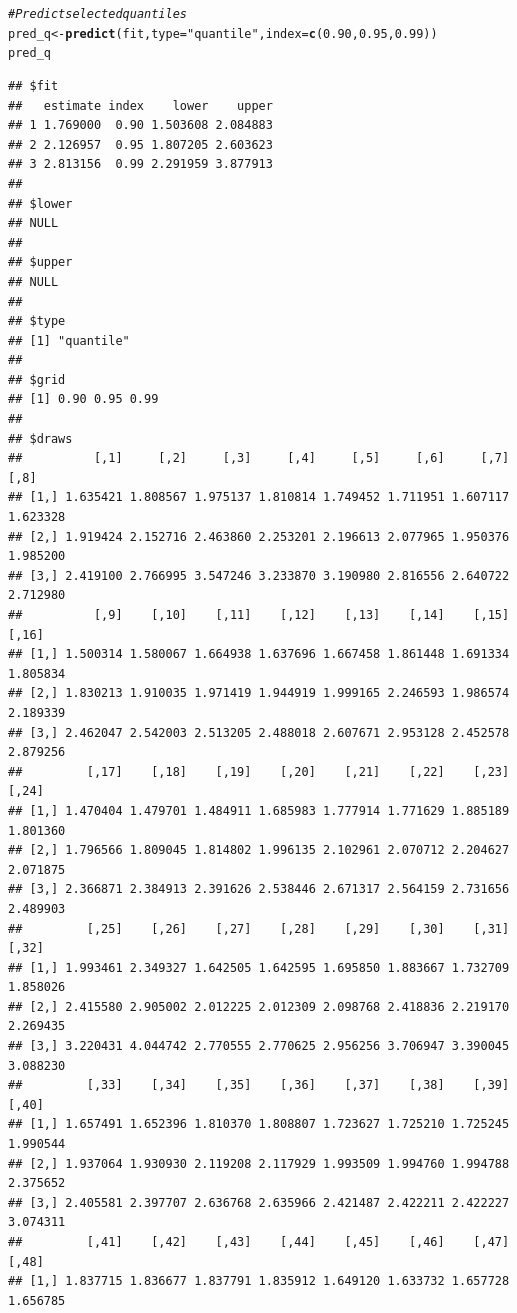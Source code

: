 \documentclass[article]{jss}\usepackage[]{graphicx}\usepackage[]{xcolor}
\makeatletter
\newcommand{\hlnum}[1]{\textcolor[rgb]{0.686,0.059,0.569}{#1}}%
\newcommand{\hlsng}[1]{\textcolor[rgb]{0.192,0.494,0.8}{#1}}%
\newcommand{\hlcom}[1]{\textcolor[rgb]{0.678,0.584,0.686}{\textit{#1}}}%
\newcommand{\hldef}[1]{\textcolor[rgb]{0.345,0.345,0.345}{#1}}%
\newcommand{\hlkwb}[1]{\textcolor[rgb]{0.69,0.353,0.396}{#1}}%
\newcommand{\hlkwc}[1]{\textcolor[rgb]{0.333,0.667,0.333}{#1}}%
\newcommand{\hlkwd}[1]{\textcolor[rgb]{0.737,0.353,0.396}{\textbf{#1}}}%
\newenvironment{kframe}{%
 \def\at@end@of@kframe{}%
 \ifinner\ifhmode%
  \def\at@end@of@kframe{\end{minipage}}%
  \begin{minipage}{\columnwidth}%
 \fi\fi%
 \def\FrameCommand##1{\hskip\@totalleftmargin \hskip-\fboxsep
 \colorbox{shadecolor}{##1}\hskip-\fboxsep
     \hskip-\linewidth \hskip-\@totalleftmargin \hskip\columnwidth}%
 \MakeFramed {\advance\hsize-\width
   \@totalleftmargin\z@ \linewidth\hsize
   \@setminipage}}%
 {\par\unskip\endMakeFramed%
 \at@end@of@kframe}
\newenvironment{knitrout}{}{} %
\makeatother
\begin{document}
\begin{knitrout}
\color{fgcolor}\begin{kframe}
\begin{alltt}
\hlcom{# Predict selected quantiles}
\hldef{pred_q} \hlkwb{<-} \hlkwd{predict}\hldef{(fit,} \hlkwc{type} \hldef{=} \hlsng{"quantile"}\hldef{,} \hlkwc{index} \hldef{=} \hlkwd{c}\hldef{(}\hlnum{0.90}\hldef{,} \hlnum{0.95}\hldef{,} \hlnum{0.99}\hldef{))}
\hldef{pred_q}
\end{alltt}
\begin{verbatim}
## $fit
##   estimate index    lower    upper
## 1 1.769000  0.90 1.503608 2.084883
## 2 2.126957  0.95 1.807205 2.603623
## 3 2.813156  0.99 2.291959 3.877913
## 
## $lower
## NULL
## 
## $upper
## NULL
## 
## $type
## [1] "quantile"
## 
## $grid
## [1] 0.90 0.95 0.99
## 
## $draws
##          [,1]     [,2]     [,3]     [,4]     [,5]     [,6]     [,7]     [,8]
## [1,] 1.635421 1.808567 1.975137 1.810814 1.749452 1.711951 1.607117 1.623328
## [2,] 1.919424 2.152716 2.463860 2.253201 2.196613 2.077965 1.950376 1.985200
## [3,] 2.419100 2.766995 3.547246 3.233870 3.190980 2.816556 2.640722 2.712980
##          [,9]    [,10]    [,11]    [,12]    [,13]    [,14]    [,15]    [,16]
## [1,] 1.500314 1.580067 1.664938 1.637696 1.667458 1.861448 1.691334 1.805834
## [2,] 1.830213 1.910035 1.971419 1.944919 1.999165 2.246593 1.986574 2.189339
## [3,] 2.462047 2.542003 2.513205 2.488018 2.607671 2.953128 2.452578 2.879256
##         [,17]    [,18]    [,19]    [,20]    [,21]    [,22]    [,23]    [,24]
## [1,] 1.470404 1.479701 1.484911 1.685983 1.777914 1.771629 1.885189 1.801360
## [2,] 1.796566 1.809045 1.814802 1.996135 2.102961 2.070712 2.204627 2.071875
## [3,] 2.366871 2.384913 2.391626 2.538446 2.671317 2.564159 2.731656 2.489903
##         [,25]    [,26]    [,27]    [,28]    [,29]    [,30]    [,31]    [,32]
## [1,] 1.993461 2.349327 1.642505 1.642595 1.695850 1.883667 1.732709 1.858026
## [2,] 2.415580 2.905002 2.012225 2.012309 2.098768 2.418836 2.219170 2.269435
## [3,] 3.220431 4.044742 2.770555 2.770625 2.956256 3.706947 3.390045 3.088230
##         [,33]    [,34]    [,35]    [,36]    [,37]    [,38]    [,39]    [,40]
## [1,] 1.657491 1.652396 1.810370 1.808807 1.723627 1.725210 1.725245 1.990544
## [2,] 1.937064 1.930930 2.119208 2.117929 1.993509 1.994760 1.994788 2.375652
## [3,] 2.405581 2.397707 2.636768 2.635966 2.421487 2.422211 2.422227 3.074311
##         [,41]    [,42]    [,43]    [,44]    [,45]    [,46]    [,47]    [,48]
## [1,] 1.837715 1.836677 1.837791 1.835912 1.649120 1.633732 1.657728 1.656785

\end{verbatim}
\end{kframe}
\end{knitrout}
\end{document}
